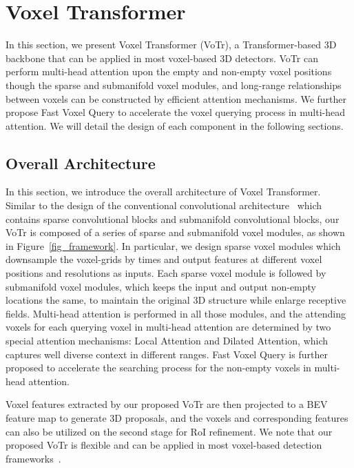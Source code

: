 \documentclass[10pt,twocolumn,letterpaper]{article}
\begin{document}
\section{Voxel Transformer}
In this section, we present Voxel Transformer (VoTr), a Transformer-based 3D backbone that can be applied in most voxel-based 3D detectors. VoTr can perform multi-head attention upon the empty and non-empty voxel positions though the sparse and submanifold voxel modules, and long-range relationships between voxels can be constructed by efficient attention mechanisms. We further propose Fast Voxel Query to accelerate the voxel querying process in multi-head attention. We will detail the design of each component in the following sections.   

\subsection{Overall Architecture}
In this section, we introduce the overall architecture of Voxel Transformer. Similar to the design of the conventional convolutional architecture~\cite{yan2018second} which contains  sparse convolutional blocks and  submanifold convolutional blocks, our VoTr is composed of a series of sparse and submanifold voxel modules, as shown in Figure~\ref{fig_framework}. In particular, we design  sparse voxel modules which downsample the voxel-grids by  times and output features at different voxel positions and resolutions as inputs. Each sparse voxel module is followed by  submanifold voxel modules, which keeps the input and output non-empty locations the same, to maintain the original 3D structure while enlarge receptive fields. Multi-head attention is performed in all those modules, and the attending voxels for each querying voxel in multi-head attention are determined by two special attention mechanisms: Local Attention and Dilated Attention, which captures well diverse context in different ranges. Fast Voxel Query is further proposed to accelerate the searching process for the non-empty voxels in multi-head attention. 

Voxel features extracted by our proposed VoTr are then projected to a BEV feature map to generate 3D proposals, and the voxels and corresponding features can also be utilized on the second stage for RoI refinement. We note that our proposed VoTr is flexible and can be applied in most voxel-based detection frameworks~\cite{yan2018second, shi2020pv, deng2020voxel}.
\end{document}
